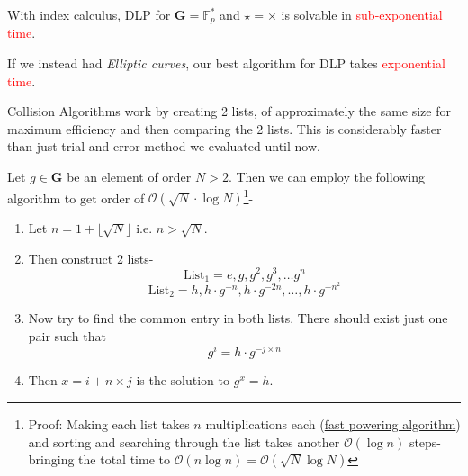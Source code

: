 			With index calculus, DLP for \(\mathbf{G}=\mathbb{F}_p^*\) and \(\star=\times \) is solvable in \textcolor{red}{sub-exponential time}.

			If we instead had \emph{Elliptic curves}, our best algorithm for DLP takes \textcolor{red}{exponential time}.

	\label{sec:colli}
		Collision Algorithms work by creating 2 lists, of approximately the same size for maximum efficiency and then comparing the 2 lists. This is considerably faster than just trial-and-error method we evaluated until now.

		\begin{tcolorbox}[breakable, title=Shank's ``Babystep- Giantstep'' Theorem,colback=blue!5!white,colframe=blue!75!black]
		 	Let \(g \in \mathbf{G}\) be an element of order \(N >2\). Then we can employ the following algorithm to get order of \(\mathcal{O}(\sqrt{N} \cdot \log N)\)\footnote{Proof: Making each list takes $n$ multiplications each (\hyperref[subsec:fastexpo]{fast powering algorithm}) and sorting and searching through the list takes another \(\mathcal{O}(\log n)\) steps- bringing the total time to \(\mathcal{O}(n \log n)= \mathcal{O}(\sqrt{N} \log N)\)}-
		 	\begin{enumerate}
		 		\item Let \(n = 1 + \lfloor\sqrt{N}\rfloor\) i.e. \(n> \sqrt{N}\).
		 		\item Then construct 2 lists- \[\text{List$_1$}= e, g, g^2, g^3, \ldots g^n\] \[\text{List$_2$}= h, h\cdot g^{-n}, h\cdot g^{-2n},
		 		\ldots , h\cdot g^{-n^2}\] 
		 		\item Now try to find the common entry in both lists. There should exist just one pair such that \[g^i = h \cdot g^{-j \times n}\]
		 		\item Then \(x = i + n \times j\) is the solution to \(g^x = h\).
		 	\end{enumerate}
		 \end{tcolorbox}
		 
